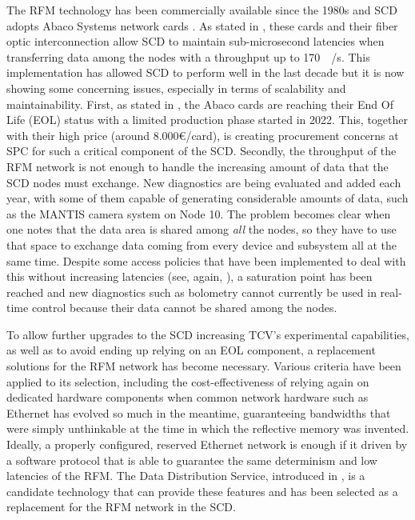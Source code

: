 The RFM technology has been commercially available since the 1980s and SCD adopts Abaco Systems network cards \cite{abaco_systems_pcie-5565rc_nodate}. As stated in , these cards and their fiber optic interconnection allow SCD to maintain sub-microsecond latencies when transferring data among the nodes with a throughput up to \SI{170}{\mega\byte/\second}. This implementation has allowed SCD to perform well in the last decade but it is now showing some concerning issues, especially in terms of scalability and maintainability. First, as stated in \cite{abaco_systems_pcie-5565rc_nodate}, the Abaco cards are reaching their End Of Life (EOL) status with a limited production phase started in 2022. This, together with their high price (around 8.000€/card), is creating procurement concerns at SPC for such a critical component of the SCD. Secondly, the throughput of the RFM network is not enough to handle the increasing amount of data that the SCD nodes must exchange. New diagnostics are being evaluated and added each year, with some of them capable of generating considerable amounts of data, such as the MANTIS camera system on Node 10. The problem becomes clear when one notes that the data area is shared among \emph{all} the nodes, so they have to use that space to exchange data coming from every device and subsystem all at the same time. Despite some access policies that have been implemented to deal with this without increasing latencies (see, again, \cite{galperti_overview_2024}), a saturation point has been reached and new diagnostics such as bolometry cannot currently be used in real-time control because their data cannot be shared among the nodes.

To allow further upgrades to the SCD increasing TCV's experimental capabilities, as well as to avoid ending up relying on an EOL component, a replacement solutions for the RFM network has become necessary. Various criteria have been applied to its selection, including the cost-effectiveness of relying again on dedicated hardware components when common network hardware such as Ethernet has evolved so much in the meantime, guaranteeing bandwidths that were simply unthinkable at the time in which the reflective memory was invented. Ideally, a properly configured, reserved Ethernet network is enough if it driven by a software protocol that is able to guarantee the same determinism and low latencies of the RFM. The Data Distribution Service, introduced in , is a candidate technology that can provide these features and has been selected as a replacement for the RFM network in the SCD.

